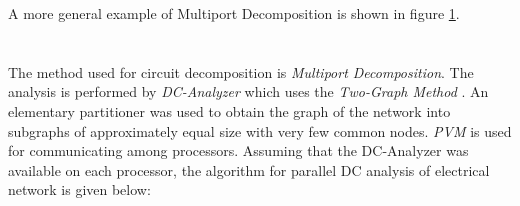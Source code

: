 \documentclass[10pt,psfig,letterpaper,twocolumn]{article}
\begin{document}
A more general example of Multiport Decomposition is shown in figure \ref{multigen}.
\begin{figure}[!ht]
{\centering {} \par}
\caption{}
\label{multigen}
\end{figure}

\section*{}

The method used for circuit decomposition is {\it Multiport Decomposition}. The analysis is
performed by {\it DC-Analyzer} \cite{SHBP} which uses the {\it Two-Graph Method} \cite{SHBP}. An elementary 
partitioner was used to obtain the graph of the network into subgraphs of approximately equal size with very
few common nodes. 
{\it PVM} \cite{PVM,PVMS} is used for communicating among processors. Assuming that the DC-Analyzer was available on
each processor, the algorithm for parallel DC analysis of electrical network is given below:
\end{document}
